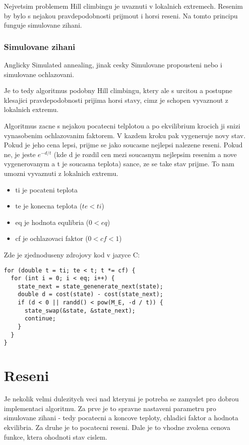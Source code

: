 \documentclass[12pt,a4paper]{article}
\begin{document}
Nejvetsim problemem Hill climbingu je uvaznuti v lokalnich extremech. Resenim by bylo s nejakou pravdepodobnosti prijmout i horsi reseni. Na tomto principu funguje simulovane zihani.

\subsubsection{Simulovane zihani}
Anglicky Simulated annealing, jinak cesky Simulovane propousteni nebo i simulovane ochlazovani.

Je to tedy algoritmus podobny Hill climbingu, ktery ale s urcitou a postupne klesajici pravdepodobnosti prijima horsi stavy, cimz je schopen vyvaznout z lokalnich extremu.

Algoritmus zacne s nejakou pocatecni telplotou a po ekvilibrium krocich ji snizi vynasobenim ochlazovanim faktorem. V kazdem kroku pak vygeneruje novy stav. Pokud je jeho cena lepsi, prijme se jako soucasne nejlepsi nalezene reseni. Pokud ne, je jeste $e^{-d/t}$ (kde d je rozdil cen mezi soucasnym nejlepsim resenim a nove vygenerovanym a t je soucasna teplota) sance, ze se take stav prijme. To nam umozni vyvaznuti z lokalnich extremu.

\begin{itemize}
\item ti je pocateni teplota
\item te je konecna teplota ($te < ti$)
\item eq je hodnota equlibria ($0 < eq$)
\item cf je ochlazovaci faktor ($0 < cf < 1$)
\end{itemize}

Zde je zjednoduseny zdrojovy kod v jazyce C:

\begin{lstlisting}[frame=single]
for (double t = ti; te < t; t *= cf) {
  for (int i = 0; i < eq; i++) {
    state_next = state_genenerate_next(state);
    double d = cost(state) - cost(state_next);
    if (d < 0 || randd() < pow(M_E, -d / t)) {
      state_swap(&state, &state_next);
      continue;
    }
  }
}
\end{lstlisting}

\section{Reseni}
Je nekolik velmi dulezitych veci nad kterymi je potreba se zamyslet pro dobrou implementaci algoritmu. Za prve je to spravne nastaveni parametru pro simulovane zihani - tedy pocatecni a koncove teploty, chladici faktor a hodnota ekvilibria. Za druhe je to pocatecni reseni. Dale je to vhodne zvolena cenova funkce, ktera ohodnoti stav cislem.
\end{document}
